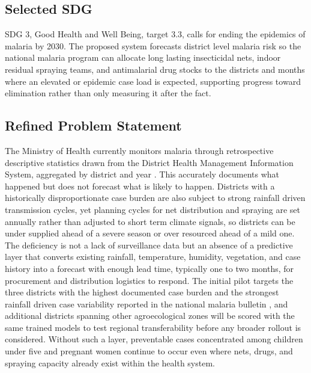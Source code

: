 \documentclass[11pt]{article}
\begin{document}
\subsection{Selected SDG}
SDG 3, Good Health and Well Being, target 3.3, calls for ending the epidemics of malaria by 2030. The proposed system forecasts district level malaria risk so the national malaria program can allocate long lasting insecticidal nets, indoor residual spraying teams, and antimalarial drug stocks to the districts and months where an elevated or epidemic case load is expected, supporting progress toward elimination rather than only measuring it after the fact.

\subsection{Refined Problem Statement}
The Ministry of Health currently monitors malaria through retrospective descriptive statistics drawn from the District Health Management Information System, aggregated by district and year \cite{rbc2024}. This accurately documents what happened but does not forecast what is likely to happen. Districts with a historically disproportionate case burden are also subject to strong rainfall driven transmission cycles, yet planning cycles for net distribution and spraying are set annually rather than adjusted to short term climate signals, so districts can be under supplied ahead of a severe season or over resourced ahead of a mild one. The deficiency is not a lack of surveillance data but an absence of a predictive layer that converts existing rainfall, temperature, humidity, vegetation, and case history into a forecast with enough lead time, typically one to two months, for procurement and distribution logistics to respond. The initial pilot targets the three districts with the highest documented case burden and the strongest rainfall driven case variability reported in the national malaria bulletin \cite{rbc2024}, and additional districts spanning other agroecological zones will be scored with the same trained models to test regional transferability before any broader rollout is considered. Without such a layer, preventable cases concentrated among children under five and pregnant women continue to occur even where nets, drugs, and spraying capacity already exist within the health system.
\end{document}
